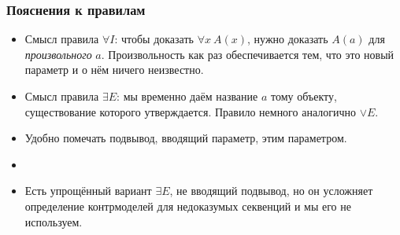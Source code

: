 \documentclass[10pt]{beamer}
\begin{document}
\begin{frame}
    \frametitle{Пояснения к правилам}
    \begin{itemize}
        \item Смысл правила $\forall I$: чтобы доказать $\forall x ~ A(x)$, нужно доказать $A(a)$ для \emph{произвольного} $a$. Произвольность как раз обеспечивается тем, что это новый параметр и о нём ничего неизвестно. \pause
        \item Смысл правила $\exists E$: мы временно даём название $a$ тому объекту, существование которого утверждается. Правило немного аналогично $\lor E$.
        \item Удобно помечать подвывод, вводящий параметр, этим параметром.
        \item[]
        \item Есть упрощённый вариант $\exists E$, не вводящий подвывод, но он усложняет определение контрмоделей для недоказумых секвенций и мы его не используем.
    \end{itemize}
\end{frame}
\end{document}
